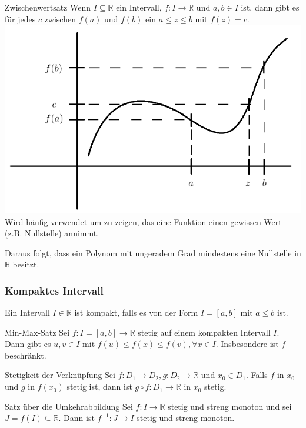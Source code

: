 \documentclass[a4paper,10pt]{article}
\def\R{\mathbb{R}}
\begin{document}
\begin{mainbox}{Zwischenwertsatz}
 Wenn $I \subseteq \R$ ein Intervall, $f: I \to \R$ und $a, b \in I$ ist, dann gibt es für jedes $c$ zwischen $f(a)$ und $f(b)$ ein $a \le z \le b$ mit $f(z) = c$.
 \includegraphics[width=\linewidth]{zwischenwertsatz.png}
 Wird häufig verwendet um zu zeigen, das eine Funktion einen gewissen Wert (z.B. Nullstelle) annimmt.
\end{mainbox}
Daraus folgt, dass ein Polynom mit ungeradem Grad mindestens eine Nullstelle in $\R$ besitzt.

\subsubsection{Kompaktes Intervall}
Ein Intervall $I \in \R$ ist kompakt, falls es von der Form $I = [a,b]$ mit $a \le b$ ist.

\begin{mainbox}{Min-Max-Satz}
 Sei $f: I = [a,b] \to \R$ stetig auf einem kompakten Intervall $I$. Dann gibt es $u, v \in I$ mit $f(u) \le f(x) \le f(v), \forall x \in I$. Insbesondere ist $f$ beschränkt.
\end{mainbox}

\begin{subbox}{Stetigkeit der Verknüpfung}
 Sei $f: D_1 \to D_2, g: D_2 \to \R$ und $x_0 \in D_1$. Falls $f$ in $x_0$ und $g$ in $f(x_0)$ stetig ist, dann ist $g \circ f: D_1 \to \R$ in $x_0$ stetig.
\end{subbox}

\begin{mainbox}{Satz über die Umkehrabbildung}
 Sei $f: I \to \R$ stetig und streng monoton und sei $J = f(I) \subseteq \R$. Dann ist $f^{-1}: J \to I$ stetig und streng monoton.
\end{mainbox}
\end{document}
